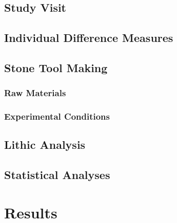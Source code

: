 \documentclass[smallextended]{svjour3}       %
\begin{document}
\hypertarget{study-visit}{%
\subsection{\texorpdfstring{\textbf{Study
Visit}}{Study Visit}}\label{study-visit}}

\hypertarget{individual-difference-measures}{%
\subsection{\texorpdfstring{\textbf{Individual Difference
Measures}}{Individual Difference Measures}}\label{individual-difference-measures}}

\hypertarget{stone-tool-making}{%
\subsection{\texorpdfstring{\textbf{Stone Tool
Making}}{Stone Tool Making}}\label{stone-tool-making}}

\hypertarget{raw-materials}{%
\subsubsection{\texorpdfstring{\textbf{Raw
Materials}}{Raw Materials}}\label{raw-materials}}

\hypertarget{experimental-conditions}{%
\subsubsection{\texorpdfstring{\textbf{Experimental
Conditions}}{Experimental Conditions}}\label{experimental-conditions}}

\hypertarget{lithic-analysis}{%
\subsection{\texorpdfstring{\textbf{Lithic
Analysis}}{Lithic Analysis}}\label{lithic-analysis}}

\hypertarget{statistical-analyses}{%
\subsection{\texorpdfstring{\textbf{Statistical
Analyses}}{Statistical Analyses}}\label{statistical-analyses}}

\hypertarget{results}{%
\section{\texorpdfstring{\textbf{Results}}{Results}}\label{results}}
\end{document}
